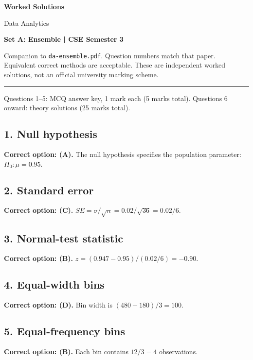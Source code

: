\documentclass[11pt,a4paper]{article}
\begin{document}
{\LARGE\bfseries Worked Solutions}\par{\large Data Analytics}\par\textbf{Set A: Ensemble | CSE Semester 3}\par
Companion to \texttt{da-ensemble.pdf}. Question numbers match that paper. Equivalent correct methods are acceptable. These are independent worked solutions, not an official university marking scheme.\par\medskip\hrule\medskip
Questions 1--5: MCQ answer key, 1 mark each (5 marks total). Questions 6 onward: theory solutions (25 marks total).\par
\noindent\begin{minipage}{\linewidth}\subsection*{1. Null hypothesis}
\textbf{Correct option: (A).} The null hypothesis specifies the population parameter: $H_0:\mu=0.95$.
\end{minipage}\par\medskip
\noindent\begin{minipage}{\linewidth}\subsection*{2. Standard error}
\textbf{Correct option: (C).} $SE=\sigma/\sqrt n=0.02/\sqrt{36}=0.02/6$.
\end{minipage}\par\medskip
\noindent\begin{minipage}{\linewidth}\subsection*{3. Normal-test statistic}
\textbf{Correct option: (B).} $z=(0.947-0.95)/(0.02/6)=-0.90$.
\end{minipage}\par\medskip
\noindent\begin{minipage}{\linewidth}\subsection*{4. Equal-width bins}
\textbf{Correct option: (D).} Bin width is $(480-180)/3=100$.
\end{minipage}\par\medskip
\noindent\begin{minipage}{\linewidth}\subsection*{5. Equal-frequency bins}
\textbf{Correct option: (B).} Each bin contains $12/3=4$ observations.
\end{minipage}\par\medskip
\end{document}
